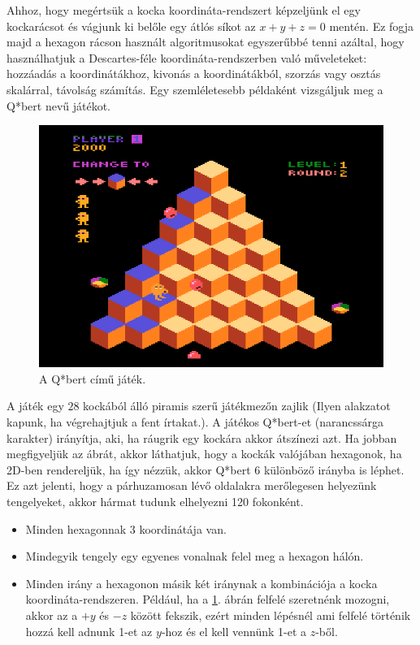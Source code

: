 \noindent Ahhoz, hogy megértsük a kocka koordináta-rendszert képzeljünk el egy kockarácsot és vágjunk ki belőle egy átlós síkot az $x + y + z = 0$ mentén. Ez fogja majd a hexagon rácson használt algoritmusokat egyszerűbbé tenni azáltal, hogy használhatjuk a Descartes-féle koordináta-rendszerben való műveleteket: hozzáadás a koordinátákhoz, kivonás a koordinátákból, szorzás vagy osztás skalárral, távolság számítás.
\newline
\newline Egy szemléletesebb példaként vizsgáljuk meg a Q*bert nevű játékot.

\begin{figure}[h!]
\centering
\includegraphics[scale=0.3]{kepek/Qbert.png}
\caption{A Q*bert című játék.}
\label{fig:Qbert}
\end{figure}

\noindent A játék egy $28$ kockából álló piramis szerű játékmezőn zajlik (Ilyen alakzatot kapunk, ha végrehajtjuk a fent írtakat.). A játékos Q*bert-et (narancssárga karakter) irányítja, aki, ha ráugrik egy kockára akkor átszínezi azt.
\newline
\newline Ha jobban megfigyeljük az ábrát, akkor láthatjuk, hogy a kockák valójában hexagonok, ha 2D-ben rendereljük, ha így nézzük, akkor Q*bert 6 különböző irányba is léphet. Ez azt jelenti, hogy a párhuzamosan lévő oldalakra merőlegesen helyezünk tengelyeket, akkor hármat tudunk elhelyezni 120 fokonként.

\begin{itemize}
\item Minden hexagonnak 3 koordinátája van. 
\item Mindegyik tengely egy egyenes vonalnak felel meg a hexagon hálón.
\item Minden irány a hexagonon másik két iránynak a kombinációja a kocka koordináta-rendszeren. Például, ha a \ref{fig:Qbert}. ábrán felfelé szeretnénk mozogni, akkor az a $+y$ és $-z$ között fekszik, ezért minden lépésnél ami felfelé történik hozzá kell adnunk 1-et az $y$-hoz és el kell vennünk 1-et a $z$-ből. 
\end{itemize}


